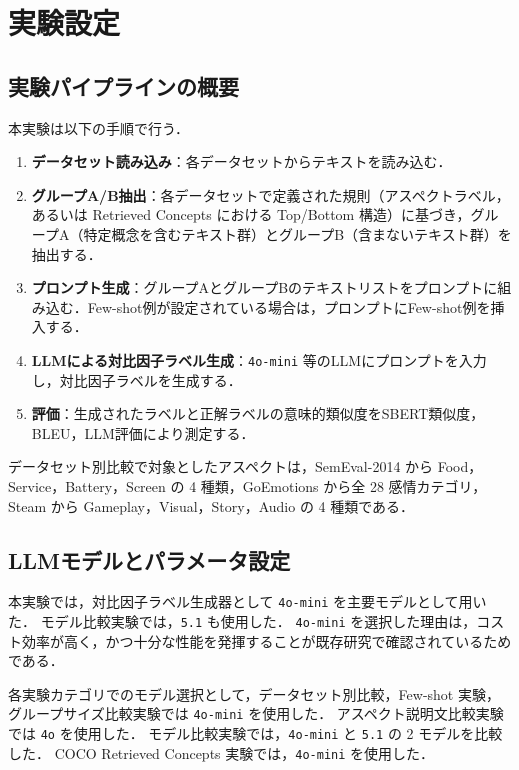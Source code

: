 \section{実験設定}
\label{sec:experiment_setup}

\subsection{実験パイプラインの概要}
本実験は以下の手順で行う．

\begin{enumerate}
  \item \textbf{データセット読み込み}：各データセットからテキストを読み込む．
\item \textbf{グループA/B抽出}：各データセットで定義された規則（アスペクトラベル，あるいは Retrieved Concepts における Top/Bottom 構造）に基づき，グループA（特定概念を含むテキスト群）とグループB（含まないテキスト群）を抽出する．
  \item \textbf{プロンプト生成}：グループAとグループBのテキストリストをプロンプトに組み込む．Few-shot例が設定されている場合は，プロンプトにFew-shot例を挿入する．
  \item \textbf{LLMによる対比因子ラベル生成}：\texttt{4o-mini} 等のLLMにプロンプトを入力し，対比因子ラベルを生成する．
  \item \textbf{評価}：生成されたラベルと正解ラベルの意味的類似度をSBERT類似度，BLEU，LLM評価により測定する．
\end{enumerate}

データセット別比較で対象としたアスペクトは，SemEval-2014 から Food，Service，Battery，Screen の 4 種類，GoEmotions から全 28 感情カテゴリ，Steam から Gameplay，Visual，Story，Audio の 4 種類である．

\subsection{LLMモデルとパラメータ設定}
本実験では，対比因子ラベル生成器として \texttt{4o-mini} を主要モデルとして用いた．
モデル比較実験では，\texttt{5.1} も使用した．
\texttt{4o-mini} を選択した理由は，コスト効率が高く，かつ十分な性能を発揮することが既存研究で確認されているためである．

各実験カテゴリでのモデル選択として，データセット別比較，Few-shot 実験，グループサイズ比較実験では \texttt{4o-mini} を使用した．
アスペクト説明文比較実験では \texttt{4o} を使用した．
モデル比較実験では，\texttt{4o-mini} と \texttt{5.1} の 2 モデルを比較した．
COCO Retrieved Concepts 実験では，\texttt{4o-mini} を使用した．

